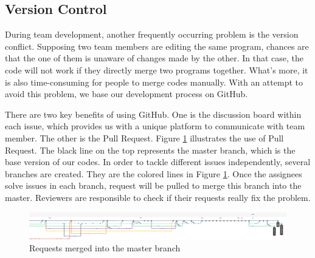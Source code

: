 \subsection{Version Control}
During team development, another frequently occurring problem is the version conflict. Supposing two team members are editing the same program, chances are that the one of them is unaware of changes made by the other. In that case, the code will not work if they directly merge two programs together. What's more, it is also time-consuming for people to merge codes manually. With an attempt to avoid this problem, we base our development process on GitHub.

There are two key benefits of using GitHub. One is the discussion board within each issue, which provides us with a unique platform to communicate with team member. The other is the Pull Request. Figure \ref{fig:request} illustrates the use of Pull Request. The black line on the top represents the master branch, which is the base version of our codes. In order to tackle different issues independently, several branches are created. They are the colored lines in Figure \ref{fig:request}. Once the assignees solve issues in each branch, request will be pulled to merge this branch into the master. Reviewers are responsible to check if their requests really fix the problem.

\begin{figure}[htbp]
    \centering
    \includegraphics[width=15cm]{management/img_management/version_control.png}
    \caption{Requests merged into the master branch}
    \label{fig:request}
\end{figure}

